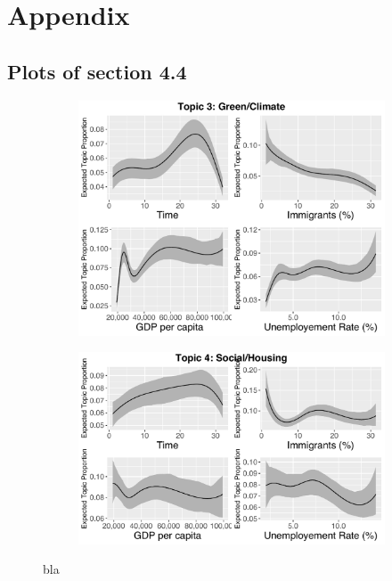 \section{Appendix}

\subsection{Plots of section 4.4}

\begin{figure}[h!]
  \centering
  \begin{subfigure}[b]{0.4\linewidth}
    \includegraphics[width=\linewidth]{../plots/appendix/4_4/beta_t3_cont.pdf}
  \end{subfigure}
  \begin{subfigure}[b]{0.4\linewidth}
    \includegraphics[width=\linewidth]{../plots/appendix/4_4/beta_t4_cont.pdf}
  \end{subfigure}
  \caption{bla}
  \label{fig:coffee}
\end{figure}

